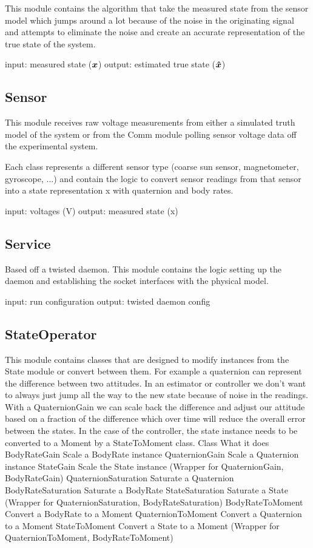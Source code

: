 This module contains the algorithm that take the measured state from the sensor model which jumps around a lot because of the noise in the originating signal and attempts to eliminate the noise and create an accurate representation of the true state of the system.

    input: measured state ($\boldsymbol{x}$)
    output: estimated true state ($\boldsymbol{\hat{x}}$)

\subsection{Sensor}
\label{subsec:Sensor}


This module receives raw voltage measurements from either a simulated truth model of the system or from the Comm module polling sensor voltage data off the experimental system.

Each class represents a different sensor type (coarse sun sensor, magnetometer, gyroscope, ...) and contain the logic to convert sensor readings from that sensor into a state representation x with quaternion and body rates.

    input: voltages (V)
    output: measured state (x)

\subsection{Service}
\label{subsec:Service}


Based off a twisted daemon. This module contains the logic setting up the daemon and establishing the socket interfaces with the physical model.

    input: run configuration
    output: twisted daemon config

\subsection{StateOperator}
\label{subsec:StateOperator}

This module contains classes that are designed to modify instances from the State module or convert between them. For example a quaternion can represent the difference between two attitudes. In an estimator or controller we don't want to always just jump all the way to the new state because of noise in the readings. With a QuaternionGain we can scale back the difference and adjust our attitude based on a fraction of the difference which over time will reduce the overall error between the states. In the case of the controller, the state instance needs to be converted to a Moment by a StateToMoment class.
Class   What it does
BodyRateGain  Scale a BodyRate instance
QuaternionGain  Scale a Quaternion instance
StateGain   Scale the State instance (Wrapper for QuaternionGain, BodyRateGain)
QuaternionSaturation  Saturate a Quaternion
BodyRateSaturation  Saturate a BodyRate
StateSaturation   Saturate a State (Wrapper for QuaternionSaturation, BodyRateSaturation)
BodyRateToMoment  Convert a BodyRate to a Moment
QuaternionToMoment  Convert a Quaternion to a Moment
StateToMoment   Convert a State to a Moment (Wrapper for QuaternionToMoment, BodyRateToMoment)

